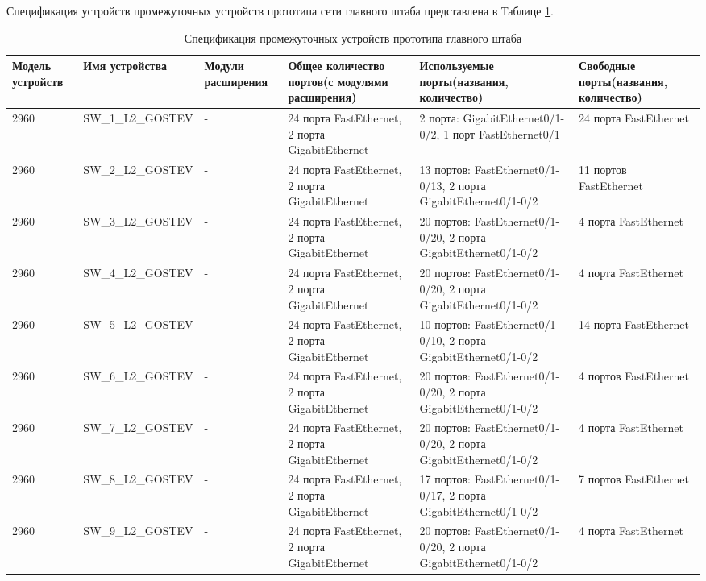\documentclass[14pt, a4paper]{extarticle}
\numberwithin{equation}{section}
\begin{document}
\begin{landscape}
Спецификация устройств промежуточных устройств прототипа сети главного штаба представлена в Таблице \ref{table:mainDepDevicesSpecs}.

\begin{table}[H]
\centering
\small
\caption{Спецификация промежуточных устройств прототипа главного штаба}
\label{table:mainDepDevicesSpecs}
\begin{tabular}{|m{2.5cm}|m{4cm}|m{2.5cm}|m{4.2cm}|m{5.3cm}|m{4cm}|}
\hline
\textbf{Модель устройств} & \textbf{Имя устройства} & \textbf{Модули расширения} & \textbf{Общее количество портов(с модулями расширения)} & \textbf{Используемые порты(названия, количество)} & \textbf{Свободные порты(названия, количество)} \\
\hline
2960 & 
SW\_1\_L2\_GOSTEV & 
- & 
24 порта FastEthernet, 2 порта GigabitEthernet 
& 2 порта: GigabitEthernet0/1-0/2, 1 порт FastEthernet0/1 
& 24 порта FastEthernet \\
\hline
2960 & 
SW\_2\_L2\_GOSTEV & 
- & 
24 порта FastEthernet, 2 порта GigabitEthernet & 
13 портов: FastEthernet0/1-0/13, 2 порта GigabitEthernet0/1-0/2 & 
11 портов FastEthernet \\
\hline
2960 &
SW\_3\_L2\_GOSTEV &
- &
24 порта FastEthernet, 2 порта GigabitEthernet &
20 портов: FastEthernet0/1-0/20, 2 порта GigabitEthernet0/1-0/2 &
4 порта FastEthernet \\
\hline
2960 &
SW\_4\_L2\_GOSTEV &
- &
24 порта FastEthernet, 2 порта GigabitEthernet &
20 портов: FastEthernet0/1-0/20, 2 порта GigabitEthernet0/1-0/2 &
4 порта FastEthernet \\
\hline
2960 &
SW\_5\_L2\_GOSTEV &
- &
24 порта FastEthernet, 2 порта GigabitEthernet &
10 портов: FastEthernet0/1-0/10, 2 порта GigabitEthernet0/1-0/2 &
14 порта FastEthernet \\
\hline
2960 &
SW\_6\_L2\_GOSTEV &
- &
24 порта FastEthernet, 2 порта GigabitEthernet &
20 портов: FastEthernet0/1-0/20, 2 порта GigabitEthernet0/1-0/2 &
4 портов FastEthernet \\
\hline
2960 &
SW\_7\_L2\_GOSTEV &
- &
24 порта FastEthernet, 2 порта GigabitEthernet &
20 портов: FastEthernet0/1-0/20, 2 порта GigabitEthernet0/1-0/2 &
4 порта FastEthernet \\
\hline
2960 &
SW\_8\_L2\_GOSTEV &
- &
24 порта FastEthernet, 2 порта GigabitEthernet &
17 портов: FastEthernet0/1-0/17, 2 порта GigabitEthernet0/1-0/2 &
7 портов FastEthernet \\
\hline
2960 &
SW\_9\_L2\_GOSTEV &
- &
24 порта FastEthernet, 2 порта GigabitEthernet &
20 портов: FastEthernet0/1-0/20, 2 порта GigabitEthernet0/1-0/2 &
4 порта FastEthernet \\
\end{tabular}
\end{table}
\end{landscape}
\end{document}
